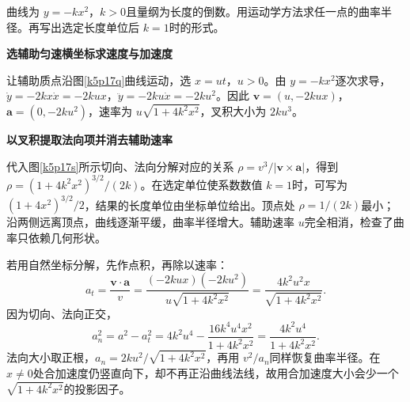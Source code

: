\begin{question}\begin{example}[抛物线的曲率半径]\label{k5p17}
曲线为 $y=-kx^2$，$k>0$且量纲为长度的倒数。用运动学方法求任一点的曲率半径。再写出选定长度单位后 $k=1$时的形式。\end{example}
\end{question}
\begin{solution}\textbf{选辅助匀速横坐标求速度与加速度}\par\nobreak
让辅助质点沿图\ref{k5p17q}曲线运动，选 $x=ut$，$u>0$。由 $y=-kx^2$逐次求导，$\dot y=-2kx\dot x=-2kux$，$\ddot y=-2ku\dot x=-2ku^2$。因此 $\bm v=(u,-2kux)$，$\bm a=(0,-2ku^2)$，速率为 $u\sqrt{1+4k^2x^2}$，叉积大小为 $2ku^3$。


\par\medskip{}\noindent\textbf{以叉积提取法向项并消去辅助速率}\par\nobreak
代入图\ref{k5p17s}所示切向、法向分解对应的关系 $\rho=v^3/|\bm v\times\bm a|$，得到 $\boxed{\rho=(1+4k^2x^2)^{3/2}/(2k)}$。在选定单位使系数数值 $k=1$时，可写为 $(1+4x^2)^{3/2}/2$，结果的长度单位由坐标单位给出。顶点处 $\rho=1/(2k)$最小；沿两侧远离顶点，曲线逐渐平缓，曲率半径增大。辅助速率 $u$完全相消，检查了曲率只依赖几何形状。

若用自然坐标分解，先作点积，再除以速率：
\[
 a_t=\frac{\bm v\cdot\bm a}{v}
 =\frac{(-2kux)(-2ku^2)}{u\sqrt{1+4k^2x^2}}
 =\frac{4k^2u^2x}{\sqrt{1+4k^2x^2}}.
\]
因为切向、法向正交，
\[
 a_n^2=a^2-a_t^2
 =4k^2u^4-\frac{16k^4u^4x^2}{1+4k^2x^2}
 =\frac{4k^2u^4}{1+4k^2x^2}.
\]
法向大小取正根，$a_n=2ku^2/\sqrt{1+4k^2x^2}$，再用 $v^2/a_n$同样恢复曲率半径。在 $x\ne0$处合加速度仍竖直向下，却不再正沿曲线法线，故用合加速度大小会少一个 $\sqrt{1+4k^2x^2}$的投影因子。\end{solution}
